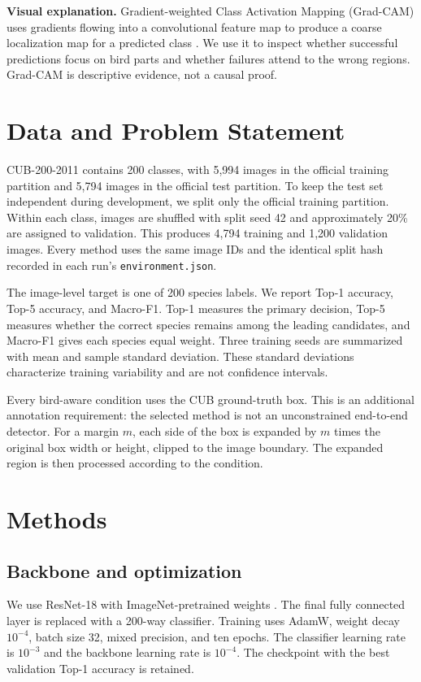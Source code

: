 \documentclass[10pt,twocolumn,letterpaper]{article}
\begin{document}
\textbf{Visual explanation.} Gradient-weighted Class Activation Mapping
(Grad-CAM) uses gradients flowing into a convolutional feature map to produce
a coarse localization map for a predicted class
\cite{selvaraju2017gradcam}. We use it to inspect whether successful
predictions focus on bird parts and whether failures attend to the wrong
regions. Grad-CAM is descriptive evidence, not a causal proof.

\section{Data and Problem Statement}

CUB-200-2011 contains 200 classes, with 5,994 images in the official training
partition and 5,794 images in the official test partition. To keep the test set
independent during development, we split only the official training partition.
Within each class, images are shuffled with split seed 42 and approximately
20\% are assigned to validation. This produces 4,794 training and 1,200
validation images. Every method uses the same image IDs and the identical
split hash recorded in each run's \texttt{environment.json}.

The image-level target is one of 200 species labels. We report Top-1
accuracy, Top-5 accuracy, and Macro-F1. Top-1 measures the primary decision,
Top-5 measures whether the correct species remains among the leading
candidates, and Macro-F1 gives each species equal weight. Three training seeds
are summarized with mean and sample standard deviation. These standard
deviations characterize training variability and are not confidence intervals.

Every bird-aware condition uses the CUB ground-truth box. This is an additional
annotation requirement: the selected method is not an unconstrained
end-to-end detector. For a margin $m$, each side of the box is expanded by
$m$ times the original box width or height, clipped to the image boundary.
The expanded region is then processed according to the condition.

\section{Methods}

\subsection{Backbone and optimization}

We use ResNet-18 with ImageNet-pretrained weights
\cite{he2016resnet}. The final fully connected layer is replaced with a
200-way classifier. Training uses AdamW, weight decay $10^{-4}$, batch size 32,
mixed precision, and ten epochs. The classifier learning rate is $10^{-3}$ and
the backbone learning rate is $10^{-4}$. The checkpoint with the best
validation Top-1 accuracy is retained.
\end{document}
